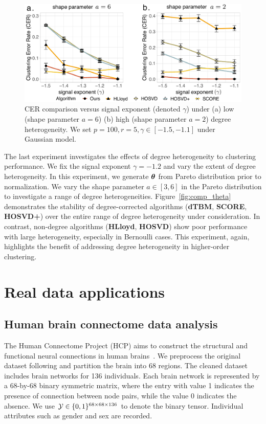 \documentclass[journal]{IEEEtran}
\theoremstyle{definition}
\theoremstyle{definition}
\begin{document}
\begin{figure}[htp!]
    \centering
    \includegraphics[width=\columnwidth]{comp_gamma_theta3.pdf}
    \caption{CER comparison versus signal exponent (denoted $\gamma$) under (a) low (shape parameter $a = 6$)  (b) high (shape parameter $a = 2$) degree heterogeneity. We set $p = 100, r = 5, \gamma \in [-1.5, -1.1]$ under Gaussian model.}
    \label{fig:comp_gamma_theta}
\end{figure}

The last experiment investigates the effects of degree heterogeneity to clustering performance. We fix the signal exponent $\gamma = -1.2$ and vary the extent of degree heterogeneity. In this experiment, we generate $\boldsymbol{\theta}$ from Pareto distribution prior to normalization. We vary the shape parameter $a \in [3,6]$ in the Pareto distribution to investigate a range of degree heterogeneities. Figure~\ref{fig:comp_theta} demonstrates the stability of degree-corrected algorithms (\textbf{\small dTBM}, \textbf{\small SCORE}, \textbf{\small HOSVD+}) over the entire range of degree heterogeneity under consideration. In contrast, non-degree algorithms (\textbf{\small HLloyd}, \textbf{\small HOSVD}) show poor performance with large heterogeneity, especially in Bernoulli cases. This experiment, again, highlights the benefit of addressing degree heterogeneity in higher-order clustering. 


\section{Real data applications}\label{sec:real}
\subsection{Human brain connectome data analysis}

The Human Connectome Project (HCP) aims to construct the structural and functional neural connections in human brains~\citep{van2013wu}. We preprocess the original dataset following \cite{desikan2006automated} and partition the brain into 68 regions. The cleaned dataset includes brain networks for 136 individuals. Each brain network is represented by a 68-by-68 binary symmetric matrix, where the entry with value 1 indicates the presence of connection between node pairs, while the value 0 indicates the absence. We use $\mathcal{Y} \in \{0,1\}^{68 \times 68 \times 136}$ to denote the binary tensor. Individual attributes such as gender and sex are recorded.
\end{document}
